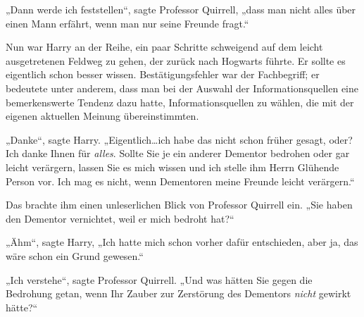 „Dann werde ich feststellen“, sagte Professor Quirrell, „dass man nicht alles über einen Mann erfährt, wenn man nur seine Freunde fragt.“

Nun war Harry an der Reihe, ein paar Schritte schweigend auf dem leicht ausgetretenen Feldweg zu gehen, der zurück nach Hogwarts führte. Er sollte es eigentlich schon besser wissen. Bestätigungsfehler war der Fachbegriff; er bedeutete unter anderem, dass man bei der Auswahl der Informationsquellen eine bemerkenswerte Tendenz dazu hatte, Informationsquellen zu wählen, die mit der eigenen aktuellen Meinung übereinstimmten.%

„Danke“, sagte Harry. „Eigentlich…ich habe das nicht schon früher gesagt, oder? Ich danke Ihnen für \emph{alles}. Sollte Sie je ein anderer Dementor bedrohen oder gar leicht verärgern, lassen Sie es mich wissen und ich stelle ihm Herrn Glühende Person vor. Ich mag es nicht, wenn Dementoren meine Freunde leicht verärgern.“

Das brachte ihm einen unleserlichen Blick von Professor Quirrell ein. „Sie haben den Dementor vernichtet, weil er mich bedroht hat?“

„Ähm“, sagte Harry, „Ich hatte mich schon vorher dafür entschieden, aber ja, das wäre schon ein Grund gewesen.“

„Ich verstehe“, sagte Professor Quirrell. „Und was hätten Sie gegen die Bedrohung getan, wenn Ihr Zauber zur Zerstörung des Dementors \emph{nicht} gewirkt hätte?“

